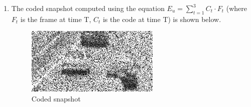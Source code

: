 \documentclass[12pt]{article}
\begin{document}
\begin{itemize}
\begin{enumerate}
    \item The coded snapshot computed using the equation $E_u = \sum_{t=1}^3 C_t \cdot F_t$ (where $F_t$ is the frame at time T, $C_t$ is the code at time T) is shown below.
    \begin{figure}[H]
        \centering
        \begin{minipage}{.45\textwidth}
            \centering
            \includegraphics[width=\linewidth]{results/cars_noisy_snapshot_3.png}
            \caption*{Coded snapshot}
        \end{minipage}
    \end{figure}


\end{enumerate}
\end{itemize}
\end{document}
